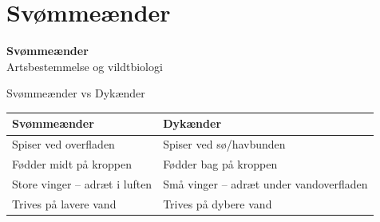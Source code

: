 \section{Svømmeænder}

\begin{frame}
  \vspace{3em}
  \begin{center}
    {\LARGE \textbf{Svømmeænder}}
    \vspace{2em}
    \\ Artsbestemmelse og vildtbiologi
\par
{\normalsize }
\vspace{1em}
\par
  \end{center}
\end{frame}



\begin{frame}{Svømmeænder vs Dykænder}
  \vspace{1.5em}
  \centering
  \small
  \begin{tabular}{@{}p{}|p{}@{}}
    \textbf{Svømmeænder} & \textbf{Dykænder} \\
    \hline
    Spiser ved overfladen & Spiser ved sø/havbunden \\[0.4em]
    Fødder midt på kroppen & Fødder bag på kroppen \\[0.4em]
    Store vinger – adræt i luften & Små vinger – adræt under vandoverfladen \\[0.4em]
    Trives på lavere vand & Trives på dybere vand \\
  \end{tabular}
\end{frame}








